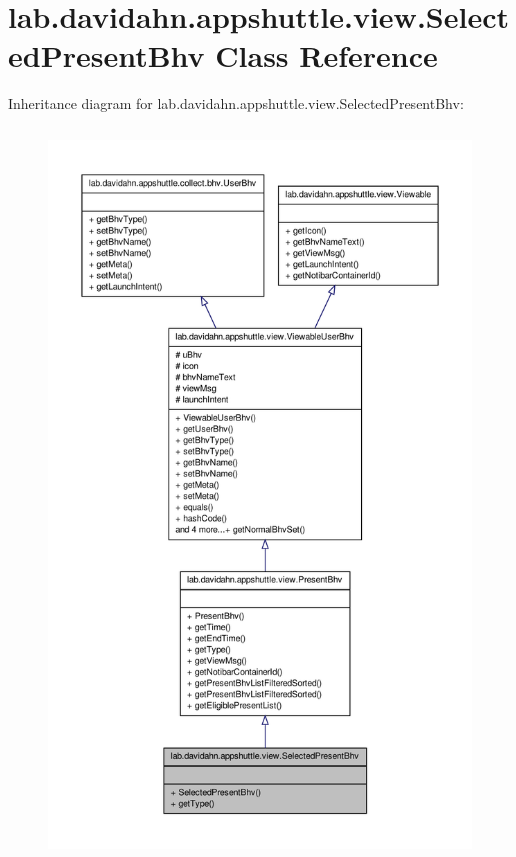 \hypertarget{classlab_1_1davidahn_1_1appshuttle_1_1view_1_1_selected_present_bhv}{\section{lab.\-davidahn.\-appshuttle.\-view.\-Selected\-Present\-Bhv \-Class \-Reference}
\label{classlab_1_1davidahn_1_1appshuttle_1_1view_1_1_selected_present_bhv}
}


\-Inheritance diagram for lab.\-davidahn.\-appshuttle.\-view.\-Selected\-Present\-Bhv\-:
\nopagebreak
\begin{figure}[H]
\begin{center}
\leavevmode
\includegraphics[height=550pt]{classlab_1_1davidahn_1_1appshuttle_1_1view_1_1_selected_present_bhv__inherit__graph}
\end{center}
\end{figure}


